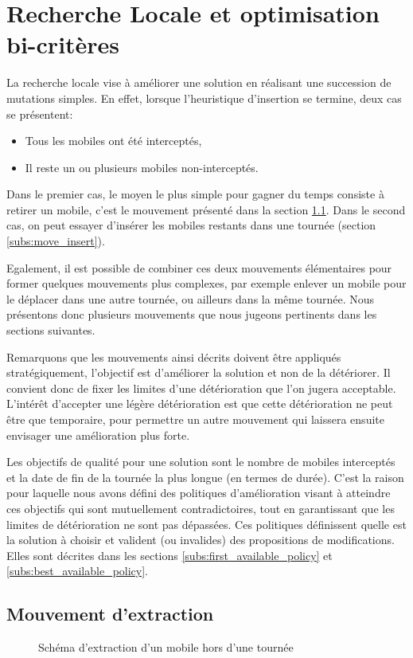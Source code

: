	\section{Recherche Locale et optimisation bi-critères}
		La recherche locale vise à améliorer une solution en réalisant une succession de mutations simples. En effet, lorsque l'heuristique d'insertion se termine, deux cas se présentent:
		\begin{itemize}
			\item Tous les mobiles ont été interceptés,
			\item Il reste un ou plusieurs mobiles non-interceptés.
		\end{itemize}

		Dans le premier cas, le moyen le plus simple pour gagner du temps consiste à retirer un mobile, c'est le mouvement présenté dans la section \ref{subs:move_extract}. Dans le second cas, on peut essayer d'insérer les mobiles restants dans une tournée (section \ref{subs:move_insert}).

		Egalement, il est possible de combiner ces deux mouvements élémentaires pour former quelques mouvements plus complexes, par exemple enlever un mobile pour le déplacer dans une autre tournée, ou ailleurs dans la même tournée. Nous présentons donc plusieurs mouvements que nous jugeons pertinents dans les sections suivantes.

		Remarquons que les mouvements ainsi décrits doivent être appliqués stratégiquement, l'objectif est d'améliorer la solution et non de la détériorer. Il convient donc de fixer les limites d'une détérioration que l'on jugera acceptable. L'intérêt d'accepter une légère détérioration est que cette détérioration ne peut être que temporaire, pour permettre un autre mouvement qui laissera ensuite envisager une amélioration plus forte.

		Les objectifs de qualité pour une solution sont le nombre de mobiles interceptés et la date de fin de la tournée la plus longue (en termes de durée). C'est la raison pour laquelle nous avons défini des politiques d'amélioration visant à atteindre ces objectifs qui sont mutuellement contradictoires, tout en garantissant que les limites de détérioration ne sont pas dépassées. Ces politiques définissent quelle est la solution à choisir et valident (ou invalides) des propositions de modifications. Elles sont décrites dans les sections \ref{subs:first_available_policy} et \ref{subs:best_available_policy}.

		\subsection{Mouvement d'extraction}
			\label{subs:move_extract}
			\begin{figure}[h!]
			\centering
			\begin{tikzpicture}[schema]
				
			\end{tikzpicture}
			\caption{Schéma d'extraction d'un mobile hors d'une tournée}
			\label{fig:move_extract}
			\end{figure}

